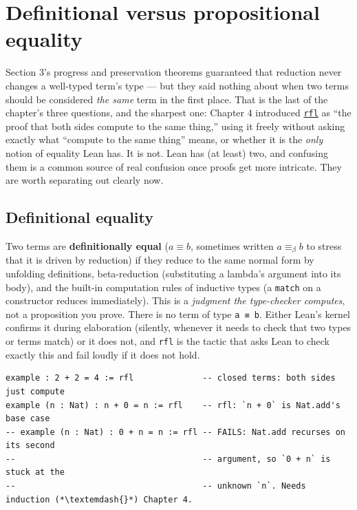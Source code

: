 \section{Definitional versus propositional equality}\label{sec:05-rigor-check:04-defeq-vs-propeq:1}

Section 3's progress and preservation theorems guaranteed that reduction never changes a well-typed term's type --- but they said nothing about when two terms should be considered \emph{the same} term in the first place. That is the last of the chapter's three questions, and the sharpest one: Chapter 4 introduced \href{https://lean-lang.org/doc/reference/latest/Tactic-Proofs/Tactic-Reference/}{\texttt{rfl}} as ``the proof that both sides compute to the same thing,'' using it freely without asking exactly what ``compute to the same thing'' means, or whether it is the \emph{only} notion of equality Lean has. It is not. Lean has (at least) two, and confusing them is a common source of real confusion once proofs get more intricate. They are worth separating out clearly now.

\subsection{Definitional equality}\label{sec:05-rigor-check:04-defeq-vs-propeq:2}

Two terms are \textbf{definitionally equal} (\(a \equiv b\), sometimes written \(a \equiv_\beta b\) to stress that it is driven by reduction) if they reduce to the same normal form by unfolding definitions, beta-reduction (substituting a lambda's argument into its body), and the built-in computation rules of inductive types (a \texttt{match} on a constructor reduces immediately). This is a \emph{judgment the type-checker computes}, not a proposition you prove. There is no term of type \texttt{a ≡ b}. Either Lean's kernel confirms it during elaboration (silently, whenever it needs to check that two types or terms match) or it does not, and \texttt{rfl} is the tactic that asks Lean to check exactly this and fail loudly if it does not hold.

\begin{lstlisting}
example : 2 + 2 = 4 := rfl              -- closed terms: both sides just compute
example (n : Nat) : n + 0 = n := rfl    -- rfl: `n + 0` is Nat.add's base case
-- example (n : Nat) : 0 + n = n := rfl -- FAILS: Nat.add recurses on its second
--                                      -- argument, so `0 + n` is stuck at the
--                                      -- unknown `n`. Needs induction (*\textemdash{}*) Chapter 4.
\end{lstlisting}

